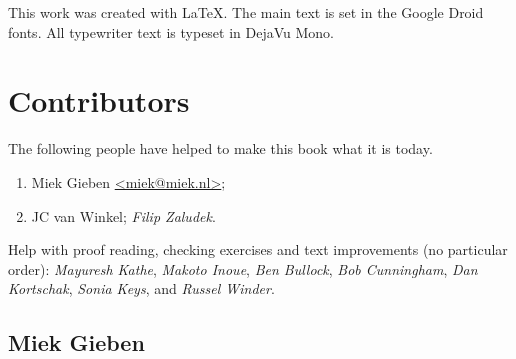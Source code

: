\noindent{}This work was created with \LaTeX. The main text is set in
the Google Droid fonts. All typewriter text is typeset in DejaVu Mono.

\section{Contributors}
The following people have helped to make this book what it is today.
\begin{enumerate}
\item{Miek Gieben \qquad\url{<miek@miek.nl>}};
\item{JC van Winkel};
\emph{Filip Zaludek}.
\end{enumerate}

Help with proof reading, checking exercises and text improvements (no
particular order):
\emph{Mayuresh Kathe},
\emph{Makoto Inoue},
\emph{Ben Bullock},
\emph{Bob Cunningham},
\emph{Dan Kortschak},
\emph{Sonia Keys},
and \emph{Russel Winder}.

\subsection{Miek Gieben}


